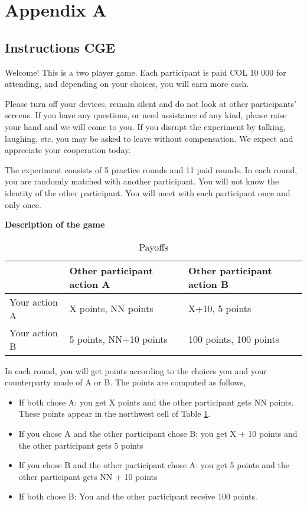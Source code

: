 \documentclass[12pt,english]{article}
\begin{document}
\section*{Appendix A}
\subsection*{Instructions CGE}

Welcome! This is a two player game. Each participant is paid COL 10 000 for attending, and depending on your choices, you will earn more cash.

Please turn off your devices, remain silent and do not look at other participants' screens. If you have any questions, or need assistance of any kind, please raise your hand and we will come to you. If you disrupt the experiment by talking, laughing, etc. you may be asked to leave without compensation. We expect and appreciate your cooperation today.

The experiment consists of 5 practice rounds and 11 paid rounds. In each round, you are randomly matched with another participant. You will not know the identity of the other participant. You will meet with each participant once and only once.
    
\noindent \textbf{Description of the game}

\begin{table}[!ht]
\centering
\begin{tabular}{l|l|l}
& Other participant action A & Other participant action B \\
\hline
Your action A & X points, NN points & X+10, 5 points  \\
\hline
Your action B & 5 points, NN+10 points & 100 points, 100 points
\end{tabular}
\caption{Payoffs}
\label{tablee}
\end{table}
In each round, you will get points according to the choices you and your counterparty made of A or B. The points are computed as follows, 

\begin{itemize}
\item If both chose A: you get X points and the other participant gets NN points. These points appear in the northwest cell of Table \ref{tablee}. 
\item  If you chose A and the other participant chose B:  you get X + 10 points and the other participant gets 5 points
\item  If you chose B and the other participant chose A: you get 5 points and the other participant gets NN + 10 points 
\item If both chose B: You and the other participant receive 100 points.

\end{itemize}
\end{document}
